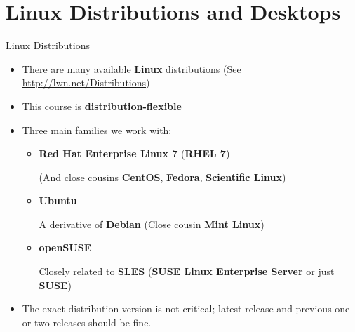 \section{Linux Distributions and Desktops}

\begin{frame}
   {Linux Distributions}

   \begin{itemize}
      \item
      There are many available \textbf{Linux} distributions
      (See \url{http://lwn.net/Distributions})
      \item
      This course is \textbf{distribution-flexible}
      \item
      Three main families we work with:
      \begin{itemize}
         \item
         \textbf{Red Hat Enterprise Linux 7 } (\textbf{RHEL
         7})

         (And close cousins \textbf{CentOS},
         \textbf{Fedora}, \textbf{Scientific Linux})
         \item
         \textbf{Ubuntu}

         A derivative of \textbf{Debian} (Close cousin
         \textbf{Mint Linux})
         \item
         \textbf{openSUSE}

         Closely related to \textbf{SLES} (\textbf{SUSE
            Linux Enterprise Server} or just \textbf{SUSE})
   \end{itemize}
   \item
   The exact distribution version is not critical; latest release
   and previous one or two releases should be fine.
\end{itemize}

\end{frame}

